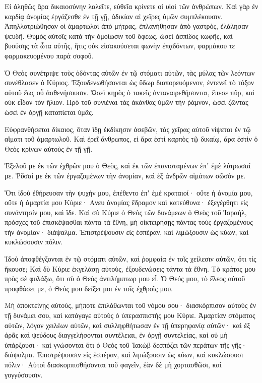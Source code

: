 \begin{spacing}{1.1}
\begin{multicols}{2}
Εἰ ἀληθῶς ἄρα δικαιοσύνην λαλεῖτε, εὐθεῖα κρίνετε οἱ υἱοὶ τῶν ἀνθρώπων.
Καὶ γὰρ ἐν καρδίᾳ ἀνομίας ἐργάζεσθε ἐν τῇ γῇ, ἀδικίαν αἱ χεῖρες ὑμῶν συμπλέκουσιν.
Ἀπηλλοτριώθησαν οἱ ἁμαρτωλοὶ ἀπὸ μήτρας, ἐπλανήθησαν ἀπὸ γαστρὸς, ἐλάλησαν ψευδῆ.
Θυμὸς αὐτοῖς κατὰ τὴν ὁμοίωσιν τοῦ ὄφεως, ὡσεὶ ἀσπίδος κωφῆς, καὶ βυούσης τὰ ὦτα αὐτῆς,
ἥτις οὐκ εἰσακούσεται φωνὴν ἐπᾳδόντων, φαρμάκου τε φαρμακευομένου παρὰ σοφοῦ.

Ὁ Θεὸς συνέτριψε τοὺς ὀδόντας αὐτῶν ἐν τῷ στόματι αὐτῶν, τὰς μύλας τῶν λεόντων συνέθλασεν ὁ Κύριος.
Ἐξουδενωθήσονται ὡς ὕδωρ διαπορευόμενον, ἐντενεῖ τὸ τόξον αὐτοῦ ἕως οὗ ἀσθενήσουσιν.
Ὡσεὶ κηρὸς ὁ τακεῖς ἀνταναιρεθήσονται, ἔπεσε πῦρ, καὶ οὐκ εἶδον τὸν ἥλιον.
Πρὸ τοῦ συνιέναι τὰς ἀκάνθας ὑμῶν τὴν ῥάμνον, ὡσεὶ ζῶντας ὡσεὶ ἐν ὀργῇ καταπίεται ὑμᾶς.

Εὐφρανθήσεται δίκαιος, ὅταν ἴδῃ ἐκδίκησιν ἀσεβῶν, τὰς χεῖρας αὐτοῦ νίψεται ἐν τῷ αἵματι τοῦ ἁμαρτωλοῦ.
Καὶ ἐρεῖ ἄνθρωπος, εἰ ἄρα ἐστὶ καρπὸς τῷ δικαίῳ, ἄρα ἐστὶν ὁ Θεὸς κρίνων αὐτοὺς ἐν τῇ γῇ.

Ἐξελοῦ με ἐκ τῶν ἐχθρῶν μου ὁ Θεὸς, καὶ ἐκ τῶν ἐπανισταμένων ἐπʼ ἐμὲ λύτρωσαί με.
Ῥῦσαί με ἐκ τῶν ἐργαζομένων τὴν ἀνομίαν, καὶ ἐξ ἀνδρῶν αἱμάτων σῶσόν με.

Ὅτι ἰδοὺ ἐθήρευσαν τὴν ψυχήν μου, ἐπέθεντο ἐπʼ ἐμὲ κραταιοί· οὔτε ἡ ἀνομία μου, οὔτε ἡ ἁμαρτία μου Κύριε·
Ανευ ἀνομίας ἔδραμον καὶ κατεύθυνα· ἐξεγέρθητι εἰς συνάντησίν μου, καὶ ἴδε.
Καὶ σὺ Κύριε ὁ Θεὸς τῶν δυνάμεων ὁ Θεὸς τοῦ Ἰσραὴλ, πρόσχες τοῦ ἐπισκέψασθαι πάντα τὰ ἔθνη, μὴ οἰκτειρήσῃς πάντας τοὺς ἐργαζομένους τὴν ἀνομίαν· διάψαλμα.
Ἐπιστρέψουσιν εἰς ἑσπέραν, καὶ λιμώξουσιν ὡς κύων, καὶ κυκλώσουσιν πόλιν.

Ἰδοὺ ἀποφθέγξονται ἐν τῷ στόματι αὐτῶν, καὶ ῥομφαία ἐν τοῖς χείλεσιν αὐτῶν, ὅτι τίς ἤκουσε;
Καὶ δὺ Κύριε ἐκγελάσῃ αὐτοὺς, ἐξουδενώσεις τάντα τὰ ἔθνη.
Τὸ κράτος μου πρὸς σὲ φυλάξω, ὅτι σὺ ὁ Θεὸς ἀντιλήμπτωρ μου εἶ.
Ὁ Θεός μου, τὸ ἔλεος αὐτοῦ προφθάσει με, ὁ Θεός μου δείξει μοι ἐν τοῖς ἐχθροῖς μου.

Μὴ ἀποκτείνῃς αὐτοὺς, μήποτε ἐπιλάθωνται τοῦ νόμου σου· διασκόρπισον αὐτοὺς ἐν τῇ δυνάμει σου, καὶ κατάγαγε αὐτοὺς ὁ ὑπερασπιστής μου Κύριε.
Ἁμαρτίαν στόματος αὐτῶν, λόγον χειλέων αὐτῶν, καὶ συλληφθήτωσαν ἐν τῇ ὑπερηφανίᾳ αὐτῶν· καὶ ἐξ ἀρᾶς καὶ ψεύδους διαγγελήσονται
συντέλειαι, ἐν ὀργῇ συντελείας, καὶ οὐ μὴ ὑπάρξουσι· καὶ γνώσονται ὅτι ὁ Θεὸς τοῦ Ἰακὼβ δεσπόζει τῶν περάτων τῆς γῆς· διάψαλμα.
Ἐπιστρέψουσιν εἰς ἑσπέραν, καὶ λιμώξουσιν ὡς κύων, καὶ κυκλώσουσι πόλιν·
Αὐτοὶ διασκορπισθήσονται τοῦ φαγεῖν, ἐὰν δὲ μὴ χορτασθῶσι, καὶ γογγύσουσιν.


\end{multicols}
\end{spacing}
